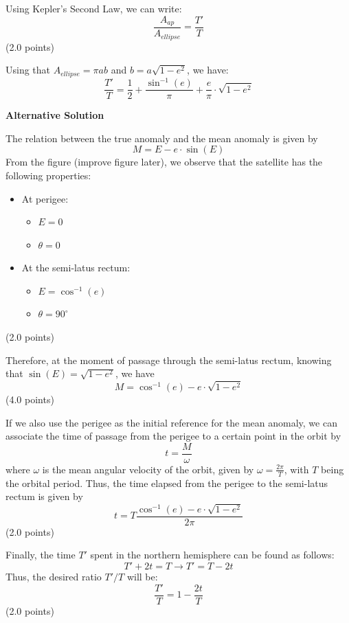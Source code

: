 \begin{description}
  Using Kepler's Second Law, we can write:
  \[
    \frac{A_{ap}}{A_{ellipse}} = \frac{T'}{T}
  \]
  \hfill(2.0 points)

  Using that $A_{ellipse} = \pi ab$ and $b = a\sqrt{1 - e^2}$, we have:
  \[
    \boxed{\frac{T'}{T} = \frac{1}{2} + \frac{\sin^{-1}(e)}{\pi}
      + \frac{e}{\pi}\cdot\sqrt{1 - e^2}}
  \]

  \textbf{Alternative Solution}


  The relation between the true anomaly and the mean anomaly is given by
  \[
    M = E - e\cdot\sin(E)
  \]
  From the figure (improve figure later), we observe that the satellite has %
  the following properties:
  \begin{itemize}
    \item At perigee:
      \begin{itemize}
        \item $E = 0$
        \item $\theta = 0$
      \end{itemize}
    \item At the semi-latus rectum:
      \begin{itemize}
        \item $E = \cos^{-1}(e)$
        \item $\theta = 90^\circ$
      \end{itemize}
  \end{itemize}
  \hfill(2.0 points)

  Therefore, at the moment of passage through the semi-latus rectum, knowing
  that $\sin(E) = \sqrt{1 - e^2}$, we have
  \[
    M = \cos^{-1}(e) - e\cdot\sqrt{1 - e^2}
  \]
  \hfill(4.0 points)

  If we also use the perigee as the initial reference for the mean anomaly, we
  can associate the time of passage from the perigee to a certain point in the
  orbit by
  \[
    t = \frac{M}{\omega}
  \]
  where $\omega$ is the mean angular velocity of the orbit, given by
  $\omega = \frac{2\pi}{T}$, with $T$ being the orbital period. Thus, the time
  elapsed from the perigee to the semi-latus rectum is given by
  \[
    t = T\frac{\cos^{-1}(e) - e\cdot\sqrt{1 - e^2}}{2\pi}
  \]
  \hfill(2.0 points)

  Finally, the time $T'$ spent in the northern hemisphere can be found as
  follows:
  \[
    T' + 2t = T \rightarrow T' = T - 2t
  \]
  Thus, the desired ratio $T'/T$ will be:
  \[
    \frac{T'}{T} = 1 - \frac{2t}{T}
  \]
  \hfill(2.0 points)


\end{description}

